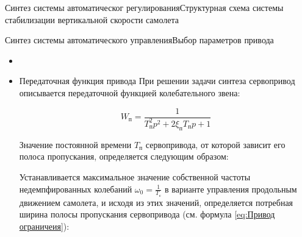 \begin{frame}{Синтез системы автоматическог регулирования}{Структурная схема системы стабилизации вертикальной скорости самолета}
\end{frame}

\begin{frame}{Синтез системы автоматического управления}{Выбор параметров привода}
    \begin{itemize}
    \item <+-> []
    \item <+-> []   \begin{block}{Передаточная функция привода}
        При решении задачи синтеза сервопривод описывается передаточной функцией колебательного звена:
    
    \begin{equation}
    \label{eq:Привод ограничеия}
        W_{\text{п}}=\frac{1}{T_\text{п}^2p^2+2\xi_\text{п}T_\text{п}p+1}
    \end{equation}
    
    Значение постоянной времени  $T_\text{п}$ сервопривода, от которой зависит его полоса пропускания, определяется следующим образом:
    
    Устанавливается максимальное значение собственной частоты  недемпфированных колебаний $\omega_0=\frac{1}{T_{\text{с}}}$ в варианте управления продольным движением самолета, и исходя из этих значений, определяется потребная ширина полосы пропускания сервопривода (см. формула \ref{eq:Привод ограничеия}):
    \end{block}
\end{itemize}
\end{frame}

